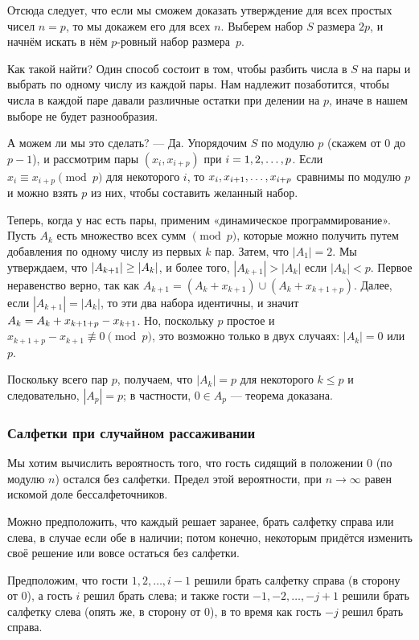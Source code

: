 Отсюда следует, что если мы сможем доказать утверждение для всех простых чисел $n=p$, то мы докажем его для всех $n$.
Выберем набор $S$ размера $2p$, и начнём искать в нём $p$-ровный набор размера~$p$.

Как такой найти?
Один способ состоит в том, чтобы разбить числа в $S$ на пары и выбрать по одному числу из каждой пары.
Нам  надлежит позаботится, чтобы числа в каждой паре давали различные остатки при делении на $p$, иначе в нашем выборе не будет разнообразия.

А можем ли мы это сделать? --- Да.
Упорядочим $S$ по модулю $p$ (скажем от $0$ до $p-1$), и рассмотрим пары $(x_i,x_{i+p})$ при $i\z=1,2,\dots, p$.
Если $x_i\equiv x_{i+p}\pmod p$ для некоторого $i$, то $x_i,x_{i+1},\z\dots,x_{i+p}$ сравнимы по модулю $p$ и можно взять $p$ из них, чтобы составить желанный набор.

Теперь, когда у нас есть пары, применим «динамическое программирование».
Пусть $A_k$ есть множество всех сумм $\pmod p$, которые можно получить путем добавления по одному числу из первых $k$ пар.
Затем, что $|A_1|= 2$.
Мы утверждаем, что $|A_{k+1}|\z\ge|A_k|$, и более того, $|A_{k+1}|>|A_k|$ если $|A_k|< p$.
Первое неравенство верно, так как $A_{k+1} = (A_k+x_{k+1}) \cup (A_k+x_{k+1+p})$.
Далее, если $|A_{k+1}|=|A_k|$, то эти два набора идентичны, и значит  $A_k \z= A_k+x_{k+1+p}-x_{k+1}$.
Но, поскольку $p$ простое и $x_{k+1+p}-x_{k+1}\not\equiv 0\pmod p$, это возможно только в двух случаях: $|A_k|= 0$ или $p$.

Поскольку всего пар $p$, получаем, что $|A_k|= p$ для некоторого $k \le p$ и следовательно, $|A_p|= p$; в частности, $0\in A_p$ --- теорема доказана. \heart

\subsubsection*{Салфетки при случайном рассаживании}

Мы хотим вычислить вероятность того, что гость сидящий в положении 0 (по модулю $n$) остался без салфетки.
Предел этой вероятности, при $n\to\infty$ равен искомой доле бессалфеточников.

Можно предположить, что каждый решает заранее, брать салфетку справа или слева, в случае если обе в наличии;
потом конечно, некоторым придётся изменить своё решение или вовсе остаться без салфетки.

Предположим, что гости $1,2,\dots, i - 1$ решили брать салфетку справа  (в сторону от 0), а гость $i$ решил брать слева;
и также гости $-1,-2,\dots, -j + 1$ решили брать салфетку слева (опять же, в сторону от 0), в то время как гость $-j$ решил брать справа.

